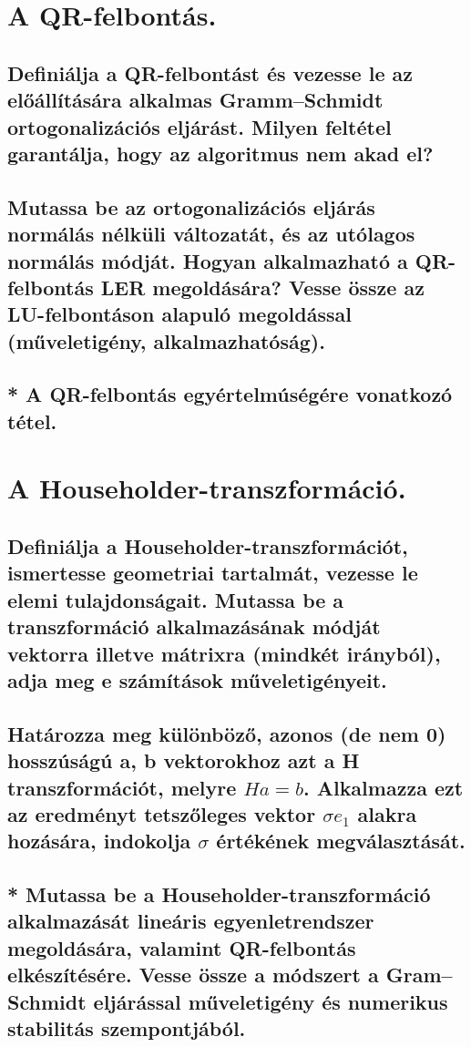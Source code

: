 \documentclass{article}
\begin{document}
    \section{A QR-felbontás.}
        \subsection{Definiálja a QR-felbontást és vezesse le az előállítására alkalmas Gramm–Schmidt ortogonalizációs eljárást. Milyen feltétel garantálja, hogy az algoritmus nem akad el?}
        \subsection{Mutassa be az ortogonalizációs eljárás normálás nélküli változatát, és az utólagos normálás módját. Hogyan alkalmazható a QR-felbontás LER megoldására? Vesse össze az LU-felbontáson alapuló megoldással (műveletigény, alkalmazhatóság).}
        \subsection{* A QR-felbontás egyértelmúségére vonatkozó tétel.}


    \section{A Householder-transzformáció.}
        \subsection{Definiálja a Householder-transzformációt, ismertesse geometriai tartalmát, vezesse le elemi tulajdonságait. Mutassa be a transzformáció alkalmazásának módját vektorra illetve mátrixra (mindkét irányból), adja meg e számítások műveletigényeit.}
        \subsection{Határozza meg különböző, azonos (de nem 0) hosszúságú a, b vektorokhoz azt a H transzformációt, melyre $Ha = b$. Alkalmazza ezt az eredményt tetszőleges vektor $\sigma e_1$ alakra hozására, indokolja $\sigma$ értékének megválasztását.}
        \subsection{* Mutassa be a Householder-transzformáció alkalmazását lineáris egyenletrendszer megoldására, valamint QR-felbontás elkészítésére. Vesse össze a módszert a Gram–Schmidt eljárással műveletigény és numerikus stabilitás szempontjából.}
\end{document}
